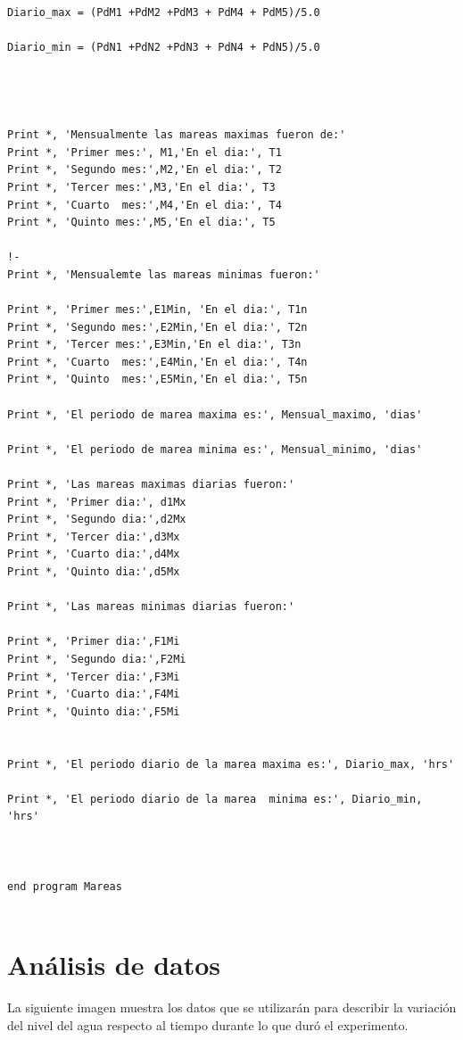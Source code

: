 \documentclass[]{article}
\begin{document}
\begin{verbatim}
Diario_max = (PdM1 +PdM2 +PdM3 + PdM4 + PdM5)/5.0

Diario_min = (PdN1 +PdN2 +PdN3 + PdN4 + PdN5)/5.0




Print *, 'Mensualmente las mareas maximas fueron de:'       
Print *, 'Primer mes:', M1,'En el dia:', T1
Print *, 'Segundo mes:',M2,'En el dia:', T2              
Print *, 'Tercer mes:',M3,'En el dia:', T3
Print *, 'Cuarto  mes:',M4,'En el dia:', T4             
Print *, 'Quinto mes:',M5,'En el dia:', T5

!-
Print *, 'Mensualemte las mareas minimas fueron:'
       
Print *, 'Primer mes:',E1Min, 'En el dia:', T1n
Print *, 'Segundo mes:',E2Min,'En el dia:', T2n           
Print *, 'Tercer mes:',E3Min,'En el dia:', T3n
Print *, 'Cuarto  mes:',E4Min,'En el dia:', T4n              
Print *, 'Quinto  mes:',E5Min,'En el dia:', T5n

Print *, 'El periodo de marea maxima es:', Mensual_maximo, 'dias'

Print *, 'El periodo de marea minima es:', Mensual_minimo, 'dias'

Print *, 'Las mareas maximas diarias fueron:'       
Print *, 'Primer dia:', d1Mx
Print *, 'Segundo dia:',d2Mx           
Print *, 'Tercer dia:',d3Mx
Print *, 'Cuarto dia:',d4Mx           
Print *, 'Quinto dia:',d5Mx

Print *, 'Las mareas minimas diarias fueron:'     

Print *, 'Primer dia:',F1Mi
Print *, 'Segundo dia:',F2Mi             
Print *, 'Tercer dia:',F3Mi
Print *, 'Cuarto dia:',F4Mi              
Print *, 'Quinto dia:',F5Mi


Print *, 'El periodo diario de la marea maxima es:', Diario_max, 'hrs'

Print *, 'El periodo diario de la marea  minima es:', Diario_min, 'hrs' 



end program Mareas


\end{verbatim}

\section*{An\'alisis de datos}
La siguiente imagen muestra los datos que se utilizar\'an para describir la variaci\'on del nivel del agua respecto al tiempo durante lo que dur\'o el experimento.
\end{document}

